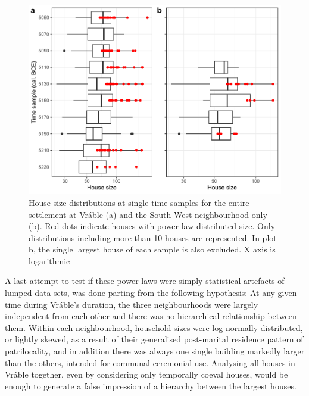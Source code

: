 \documentclass[
  12pt,
  a4paper, twoside]{book}
\begin{document}
\begin{figure}

{\centering \includegraphics[width=0.9\linewidth]{bookdown-demo_files/figure-latex/06-time-box-1} 

}

\caption[House sizes at Vráble by time sample]{House-size distributions at single time samples for the entire settlement at Vráble (a) and the South-West neighbourhood only (b). Red dots indicate houses with power-law distributed size. Only distributions including more than 10 houses are represented. In plot b, the single largest house of each sample is also excluded. X axis is logarithmic}\label{fig:06-time-box}
\end{figure}

A last attempt to test if these power laws were simply statistical artefacts of lumped data sets, was done parting from the following hypothesis: At any given time during Vráble's duration, the three neighbourhoods were largely independent from each other and there was no hierarchical relationship between them. Within each neighbourhood, household sizes were log-normally distributed, or lightly skewed, as a result of their generalised post-marital residence pattern of patrilocality, and in addition there was always one single building markedly larger than the others, intended for communal ceremonial use. Analysing all houses in Vráble together, even by considering only temporally coeval houses, would be enough to generate a false impression of a hierarchy between the largest houses.
\end{document}
